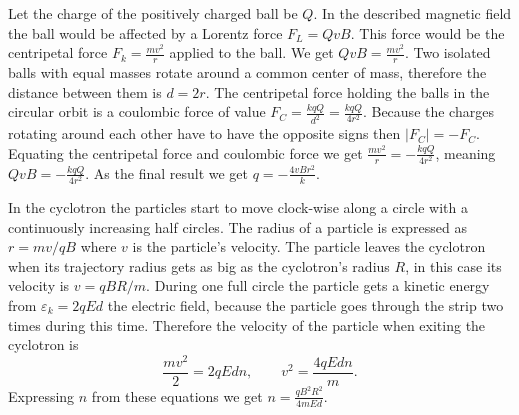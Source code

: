 \documentclass[11pt]{article}
\begin{document}

\solueng
Let the charge of the positively charged ball be $Q$. In the described magnetic field the ball would be affected by a Lorentz force $F_L=QvB$. This force would be the centripetal force $F_k=\frac{mv^2}{r}$ applied to the ball. We get $QvB=\frac{mv^2}{r}$. Two isolated balls with equal masses rotate around a common center of mass, therefore the distance between them is $d=2r$. The centripetal force holding the balls in the circular orbit is a coulombic force of value $F_C=\frac{kqQ}{d^2}=\frac{kqQ}{4r^2}$. Because the charges rotating around each other have to have the opposite signs then $|F_C|=-F_C$. Equating the centripetal force and coulombic force we get $\frac{mv^2}{r}=-\frac{kqQ}{4r^2}$, meaning $QvB=-\frac{kqQ}{4r^2}$. As the final result we get $q=-\frac{4vBr^2}{k}$.
\probend
\bigskip


\solueng
In the cyclotron the particles start to move clock-wise along a circle with a continuously increasing half circles. The radius of a particle is expressed as $r=mv/qB$ where $v$ is the particle’s velocity. The particle leaves the cyclotron when its trajectory radius gets as big as the cyclotron’s radius $R$, in this case its velocity is $v=qBR/m$. During one full circle the particle gets a kinetic energy from $\varepsilon_k=2qEd$ the electric field, because the particle goes through the strip two times during this time. Therefore the velocity of the particle when exiting the cyclotron is
\[\frac{mv^2}{2}=2qEdn, \qquad v^2=\frac{4qEdn}{m}.\]
Expressing $n$ from these equations we get $\displaystyle n=\frac{qB^2R^2}{4mEd}$.
\probend
\bigskip

\end{document}
